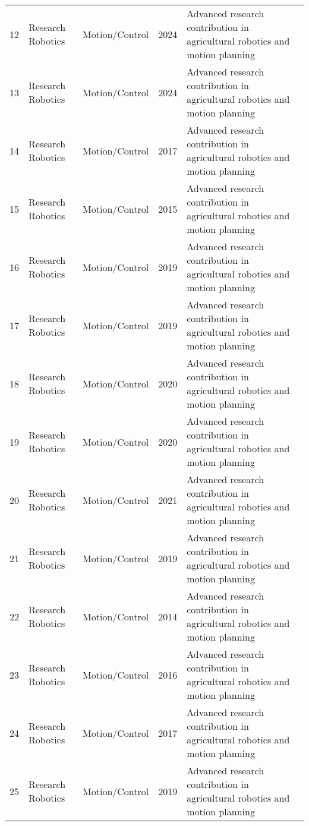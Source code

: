 \begin{table*}[htbp]
\begin{tabular}{p{}p{}p{}p{}p{}p{}}
 12 & Research Robotics & Motion/Control & 2024 & Advanced research contribution in agricultural robotics and motion planning & \cite{li2024accurate} \\
 13 & Research Robotics & Motion/Control & 2024 & Advanced research contribution in agricultural robotics and motion planning & \cite{li2024reconfigurable} \\
 14 & Research Robotics & Motion/Control & 2017 & Advanced research contribution in agricultural robotics and motion planning & \cite{lili2017development} \\
 15 & Research Robotics & Motion/Control & 2015 & Advanced research contribution in agricultural robotics and motion planning & \cite{lillicrap2015continuous} \\
 16 & Research Robotics & Motion/Control & 2019 & Advanced research contribution in agricultural robotics and motion planning & \cite{lin2019field} \\
 17 & Research Robotics & Motion/Control & 2019 & Advanced research contribution in agricultural robotics and motion planning & \cite{lin2019guava} \\
 18 & Research Robotics & Motion/Control & 2020 & Advanced research contribution in agricultural robotics and motion planning & \cite{lin2020color} \\
 19 & Research Robotics & Motion/Control & 2020 & Advanced research contribution in agricultural robotics and motion planning & \cite{lin2020fruit} \\
 20 & Research Robotics & Motion/Control & 2021 & Advanced research contribution in agricultural robotics and motion planning & \cite{lin2021collision} \\
 21 & Research Robotics & Motion/Control & 2019 & Advanced research contribution in agricultural robotics and motion planning & \cite{ling2019dual} \\
 22 & Research Robotics & Motion/Control & 2014 & Advanced research contribution in agricultural robotics and motion planning & \cite{liu2014reconfigurable} \\
 23 & Research Robotics & Motion/Control & 2016 & Advanced research contribution in agricultural robotics and motion planning & \cite{liu2016method} \\
 24 & Research Robotics & Motion/Control & 2017 & Advanced research contribution in agricultural robotics and motion planning & \cite{liu2017research} \\
 25 & Research Robotics & Motion/Control & 2019 & Advanced research contribution in agricultural robotics and motion planning & \cite{liu2019mature} \\

\end{tabular}
\end{table*}
